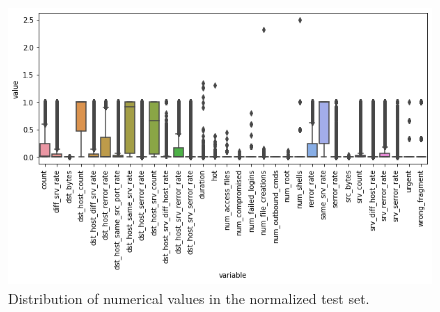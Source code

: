\begin{figure}[h]
    \centering
    \includegraphics[width=\linewidth]{img/box_test.png}
    \caption{Distribution of numerical values in the normalized test set.}
    \label{fig:testnorm}
\end{figure}

\FloatBarrier
